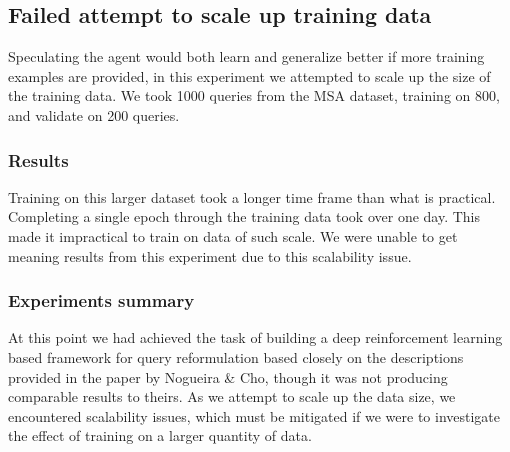 \subsection{Failed attempt to scale up training data}

Speculating the agent would both learn and generalize better if more training examples are provided, in this experiment we attempted to scale up the size of the training data. We took 1000 queries from the MSA dataset,  training on 800, and validate on 200 queries. 

\subsubsection{Results}

Training on this larger dataset took a longer time frame than what is practical. Completing a single epoch through the training data took over one day. This made it impractical to train on data of such scale. We were unable to get meaning results from this experiment due to this scalability issue.





%

%
%
%
%




\subsubsection{Experiments summary}

At this point we had achieved the task of building a deep reinforcement learning based framework for query reformulation based closely on the descriptions provided in the paper by Nogueira \& Cho\cite{nogueira2017task}, though it was not producing comparable results to theirs. As we attempt to scale up the data size, we encountered scalability issues, which must be mitigated if we were to investigate the effect of training on a larger quantity of data.




